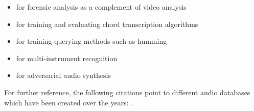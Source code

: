 \begin{itemize}
\item for forensic analysis as a complement of video analysis \parencite{serizel:hal-01393959}
\item for training and evaluating chord transcription algorithms \parencite{DBLP:conf/ismir/EremenkoDBS18}
\item for training querying methods such as humming \parencite{DBLP:journals/corr/Brzezinski-SpiczakDLP13, DBLP:journals/corr/NagaviB14, DBLP:journals/corr/abs-1301-1894}
\item for multi-instrument recognition \parencite{DBLP:conf/ismir/HumphreyDM18}
\item for adversarial audio synthesis \parencite{2018arXiv180204208D}
\end{itemize}

For further reference, the following citations point to different audio databases which have been created over the years: \parencite{DBLP:conf/ismir/GotoHNO02, DBLP:conf/ismir/GotoHNO03, DBLP:conf/ismir/WustC04, DBLP:conf/ismir/MaxwellE08, DBLP:conf/ismir/Bertin-MahieuxEWL11, DBLP:conf/ismir/Karaosmanoglu12, Jaimovich:2012, Mital:2013, bbortz:2015, jjaimovich:2015,Nort2016,  DBLP:conf/ismir/DefferrardBVB17, DBLP:conf/ismir/VigliensoniF17, DBLP:conf/ismir/Meseguer-Brocal18, DBLP:conf/ismir/DonahueMM18, DBLP:conf/ismir/XiBPYB18, DBLP:conf/ismir/WilkinsSWP18}.